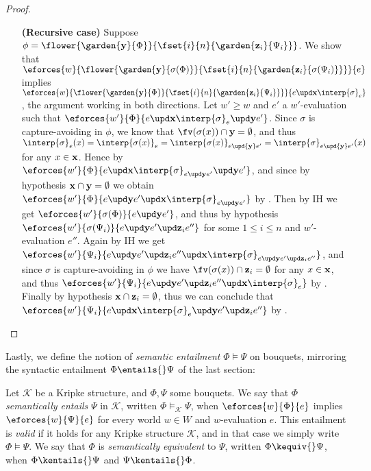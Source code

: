 \begin{scope}
\begin{proof}
\begin{itemize}
    \item[\textbf{(Recursive case)}]
    Suppose $\phi =
    \flower{\garden{\by}{\Phi}}{\fset{i}{n}{\garden{\bz_i}{\Psi_i}}}$. We show
    that
    $\eforces{w}{\flower{\garden{\by}{\sigma(\Phi)}}{\fset{i}{n}{\garden{\bz_i}{\sigma(\Psi_i)}}}}{e}$
    implies
    $\eforces{w}{\flower{\garden{\by}{\Phi}}{\fset{i}{n}{\garden{\bz_i}{\Psi_i}}}}{\update{e}{\bx}{\interp{\sigma}}_e}$,
    the argument working in both directions. Let $w' \geq w$ and $e'$ a
    $w'$-evaluation such that
    $\eforces{w'}{\Phi}{\update{e}{\bx}{\update{\interp{\sigma}_e}{\by}{e'}}}$.
    Since $\sigma$ is capture-avoiding in $\phi$, we know that $\fv(\sigma(x))
    \cap \by = \emptyset$, and thus $\interp{\sigma}_e(x) =
    \interp{\sigma(x)}_{e} = \interp{\sigma(x)}_{e \upd{\by} e'} =
    \interp{\sigma}_{e \upd{\by} e'}(x)$ for any $x \in \mathbf{x}$. Hence by
    $\eforces{w'}{\Phi}{\update{e}{\bx}{\update{\interp{\sigma}_{\update{e}{\by}{e'}}}{\by}{e'}}}$,
    and since by hypothesis $\mathbf{x} \cap \mathbf{y} = \emptyset$ we obtain
    $\eforces{w'}{\Phi}{\update{e}{\by}{\update{e'}{\bx}{\interp{\sigma}_{\update{e}{\by}{e'}}}}}$
    by . Then by IH we get
    $\eforces{w'}{\sigma(\Phi)}{\update{e}{\by}{e'}}$, and thus by hypothesis
    $\eforces{w'}{\sigma(\Psi_i)}{\update{e}{\by}{\update{e'}{\bz_i}{e''}}}$ for
    some $1 \leq i \leq n$ and $w'$-evaluation $e''$. Again by IH we get
    $\eforces{w'}{\Psi_i}{\update{e}{\by}{\update{e'}{\bz_i}{\update{e''}{\bx}{\interp{\sigma}_{\update{e}{\by}{\update{e'}{\bz_i}{e''}}}}}}}$,
    and since $\sigma$ is capture-avoiding in $\phi$ we have $\fv(\sigma(x))
    \cap \bz_i = \emptyset$ for any $x \in \mathbf{x}$, and thus
    $\eforces{w'}{\Psi_i}{\update{e}{\by}{\update{e'}{\bz_i}{\update{e''}{\bx}{\interp{\sigma}_{e}}}}}$
    by . Finally by hypothesis $\mathbf{x} \cap \mathbf{z}_i =
    \emptyset$, thus we can conclude that
    $\eforces{w'}{\Psi_i}{\update{e}{\bx}{\update{\interp{\sigma}_{e}}{\by}{\update{e'}{\bz_i}{e''}}}}$
    by .
  \end{itemize}
\end{proof}

Lastly, we define the notion of \emph{semantic entailment} $\Phi \vDash \Psi$ on
bouquets, mirroring the syntactic entailment $\Phi \entails{} \Psi$ of the last
section:

\begin{definition}
  Let $\mathcal{K}$ be a Kripke structure, and $\Phi, \Psi$ some bouquets. We
  say that $\Phi$ \emph{semantically entails} $\Psi$ in $\mathcal{K}$, written
  $\Phi \vDash_{\mathcal{K}} \Psi$, when $\eforces{w}{\Phi}{e}$ implies
  $\eforces{w}{\Psi}{e}$ for every world $w \in W$ and $w$-evaluation $e$. This
  entailment is \emph{valid} if it holds for any Kripke structure $\mathcal{K}$,
  and in that case we simply write $\Phi \vDash \Psi$. We say that $\Phi$ is
  \emph{semantically equivalent} to $\Psi$, written $\Phi \kequiv{} \Psi$, when
  $\Phi \kentails{}\Psi$ and $\Psi \kentails{}\Phi$.
\end{definition}


\end{scope}
